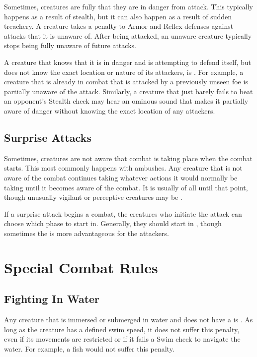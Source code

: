   Sometimes, creatures are fully \unaware that they are in danger from attack.
  This typically happens as a result of stealth, but it can also happen as a result of sudden treachery.
  A creature takes a  penalty to Armor and Reflex defenses against attacks that it is unaware of.
  After being attacked, an unaware creature typically stops being fully unaware of future attacks.

  A creature that knows that it is in danger and is attempting to defend itself, but does not know the exact location or nature of its attackers, is \partiallyunaware.
  For example, a creature that is already in combat that is attacked by a previously unseen foe is partially unaware of the attack.
  Similarly, a creature that just barely fails to beat an opponent's Stealth check may hear an ominous sound that makes it partially aware of danger without knowing the exact location of any attackers.

  \subsection{Surprise Attacks}\label{Surprise Attacks}
    Sometimes, creatures are not aware that combat is taking place when the combat starts.
    This most commonly happens with ambushes.
    Any creature that is not aware of the combat continues taking whatever actions it would normally be taking until it becomes aware of the combat.
    It is usually \unaware of all until that point, though unusually vigilant or perceptive creatures may be \partiallyunaware.

    If a surprise attack begins a combat, the creatures who initiate the attack can choose which phase to start in.
    Generally, they should start in , though sometimes the  is more advantageous for the attackers.

\section{Special Combat Rules}

  \subsection{Fighting In Water}\label{Fighting In Water}
    Any creature that is immersed or submerged in water and does not have a  is \unsteady.
    As long as the creature has a defined swim speed, it does not suffer this penalty, even if its movements are restricted or if it fails a Swim check to navigate the water.
    For example, a \grappled fish would not suffer this penalty.

